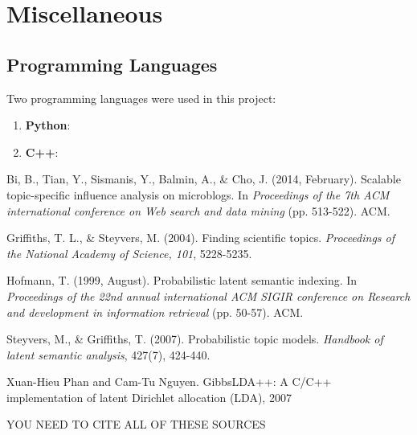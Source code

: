 \documentclass[a4paper]{article}
\begin{document}
\section{Miscellaneous}
\label{sec:misc}
\subsection{Programming Languages}
Two programming languages were used in this project:
\begin{enumerate}
\item \textbf{Python}: 
\item \textbf{C++}: 
\end{enumerate}


\begin{thebibliography}{9}
Bi, B., Tian, Y., Sismanis, Y., Balmin, A., \& Cho, J. (2014, February). Scalable topic-specific influence analysis on microblogs. In \textit{Proceedings of the 7th ACM international conference on Web search and data mining} (pp. 513-522). ACM.

Griffiths, T. L., \& Steyvers, M. (2004). Finding scientific topics. \textit{Proceedings of the National Academy of Science, 101}, 5228-5235.

Hofmann, T. (1999, August). Probabilistic latent semantic indexing. In \textit{Proceedings of the 22nd annual international ACM SIGIR conference on Research and development in information retrieval} (pp. 50-57). ACM.

Steyvers, M., \& Griffiths, T. (2007). Probabilistic topic models. \textit{Handbook of latent semantic analysis}, 427(7), 424-440.

Xuan-Hieu Phan and Cam-Tu Nguyen. GibbsLDA++: A C/C++ implementation of latent Dirichlet allocation (LDA), 2007

YOU NEED TO CITE ALL OF THESE SOURCES

\end{thebibliography}
\end{document}
